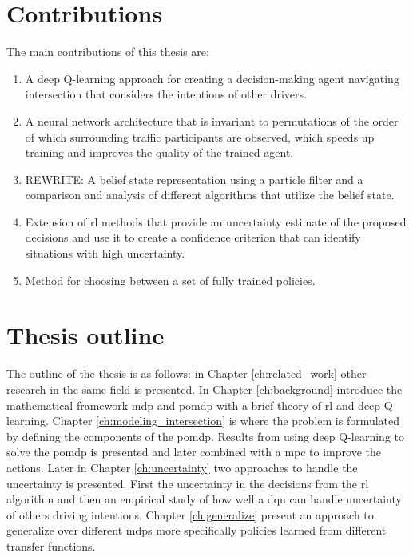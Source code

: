 \section{Contributions}
\label{sec:contributions}
The main contributions of this thesis are:
\begin{enumerate}
	\item A deep Q-learning approach for creating a decision-making agent navigating intersection that considers the intentions of other drivers. 
	\item A neural network architecture that is invariant to permutations of the order of which surrounding traffic participants are observed, which speeds up training and improves the quality of the trained agent. 
	\item REWRITE: A belief state representation using a particle filter and a comparison and analysis of different algorithms that utilize the belief state. 
	\item Extension of \gls{rl} methods that provide an uncertainty estimate of the proposed decisions and use it to create a confidence criterion that can identify situations with high uncertainty. 
	\item Method for choosing between a set of fully trained policies. 

\end{enumerate}


\section{Thesis outline}
The outline of the thesis is as follows: in Chapter \ref{ch:related_work} other research in the same field is presented. In Chapter \ref{ch:background} introduce the mathematical framework \gls{mdp} and \gls{pomdp} with a brief theory of \gls{rl} and deep Q-learning. 
Chapter \ref{ch:modeling_intersection} is where the problem is formulated by defining the components of the \gls{pomdp}. Results from using deep Q-learning to solve the \gls{pomdp} is presented and later combined with a \gls{mpc} to improve the actions. Later in Chapter \ref{ch:uncertainty} two approaches to handle the uncertainty is presented. First the uncertainty in the decisions from the \gls{rl} algorithm and then an empirical study of how well a \gls{dqn} can handle uncertainty of others driving intentions. Chapter \ref{ch:generalize} present an approach to generalize over different \gls{mdp}s more specifically policies learned from different transfer functions. 


